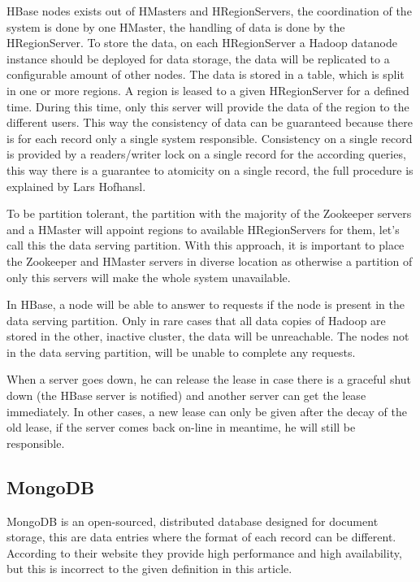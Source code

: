 \documentclass[final,5p,times]{elsarticle}
\begin{document}
HBase nodes exists out of HMasters and HRegionServers, the coordination of the system is done by one HMaster, the handling of data is done by the HRegionServer. To store the data, on each HRegionServer a Hadoop datanode instance should be deployed for data storage, the data will be replicated to a configurable amount of other nodes. The data is stored in a table, which is split in one or more regions. A region is leased to a given HRegionServer for a defined time. During this time, only this server will provide the data of the region to the different users. This way the consistency of data can be guaranteed because there is for each record only a single system responsible. Consistency on a single record is provided by a readers/writer lock on a single record for the according queries, this way there is a guarantee to atomicity on a single record, the full procedure is explained by Lars Hofhansl\cite{hbase-acid}. 

To be partition tolerant, the partition with the majority of the Zookeeper servers and a HMaster will appoint regions to available HRegionServers for them, let's call this the data serving partition. With this approach, it is important to place the Zookeeper and HMaster servers in diverse location as otherwise a partition of only this servers will make the whole system unavailable. 

In HBase, a node will be able to answer to requests if the node is present in the data serving partition. Only in rare cases that all data copies of Hadoop are stored in the other, inactive cluster, the data will be unreachable. The nodes not in the data serving partition, will be unable to complete any requests. 

When a server goes down, he can release the lease in case there is a graceful shut down (the HBase server is notified) and another server can get the lease immediately. In other cases, a new lease can only be given after the decay of the old lease, if the server comes back on-line in meantime, he will still be responsible. 

\subsection{MongoDB}
MongoDB\cite{mongodb-doc} is an open-sourced, distributed database designed for document storage, this are data entries where the format of each record can be different. According to their website they provide high performance and high availability, but this is incorrect to the given definition in this article. 
\end{document}
